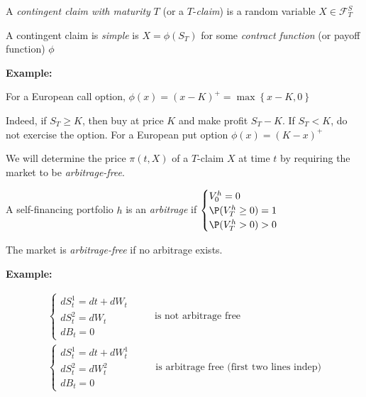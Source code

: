 \par\bigskip
\begin{defo}[]{}
  A \textit{contingent claim with maturity } $T$  (or a $T$-\textit{claim}) is a random variable $X\in \mathcal{F}_T^S$\par
  \noindent A contingent claim is \textit{simple} is $X = \phi(S_T)$ for some \textit{contract function} (or payoff function) $\phi$
\end{defo}
\par\bigskip
\noindent\textbf{Example:}\par
\noindent For a European call option, $\phi(x) = (x-K)^+ = \max\left\{x-K,0\right\}$\par
\noindent Indeed, if $S_T\geq K$, then buy at price $K$ and make profit $S_T-K$. If $S_T<K$, do not exercise the option. For a European put option $\phi(x) = (K-x)^+$\par
\noindent We will determine the price $\pi(t, X)$ of a $T$-claim $X$ at time $t$ by requiring the market to be \textit{arbitrage-free}.
\par\bigskip
\begin{defo}[]{}
  A self-financing portfolio $h$ is an \textit{arbitrage} if $\begin{cases}
    V_0^h = 0\\ \P(V_T^h\geq0) = 1\\\P(V_T^h>0)>0
  \end{cases}$
  \par\bigskip
  \noindent The market is \textit{arbitrage-free} if no arbitrage exists.
\end{defo}
\par\bigskip
\noindent\textbf{Example:}\par
\begin{equation*}
  \begin{gathered}
    \begin{cases}
      dS_t^1 = dt+dW_t\\
      dS_t^2 = dW_t\\
      dB_t = 0
    \end{cases}\qquad\text{ is not arbitrage free}\\
    \begin{cases}
      dS_t^1 = dt+dW_t^1\\
      dS_t^2 = dW_t^2\\
      dB_t = 0
    \end{cases}\qquad\text{ is arbitrage free (first two lines indep)}
  \end{gathered}
\end{equation*}
